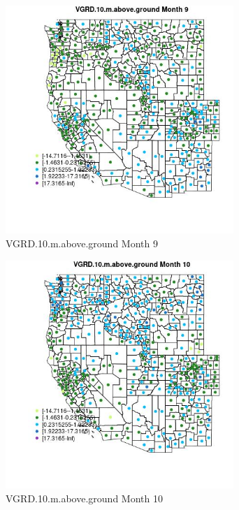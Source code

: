 \begin{figure} 
\centering  
\includegraphics[width=0.77\textwidth]{Code_Outputs/df_report_ML_predictors_CountyCentroid_Locations_Dates_2008-01-01to2018-12-31_MapObsMo9VGRD10maboveground.jpg} 
\caption{\label{fig:df_report_ML_predictors_CountyCentroid_Locations_Dates_2008-01-01to2018-12-31MapObsMo9VGRD10maboveground}VGRD.10.m.above.ground Month 9} 
\end{figure} 
 

\begin{figure} 
\centering  
\includegraphics[width=0.77\textwidth]{Code_Outputs/df_report_ML_predictors_CountyCentroid_Locations_Dates_2008-01-01to2018-12-31_MapObsMo10VGRD10maboveground.jpg} 
\caption{\label{fig:df_report_ML_predictors_CountyCentroid_Locations_Dates_2008-01-01to2018-12-31MapObsMo10VGRD10maboveground}VGRD.10.m.above.ground Month 10} 
\end{figure} 
 

